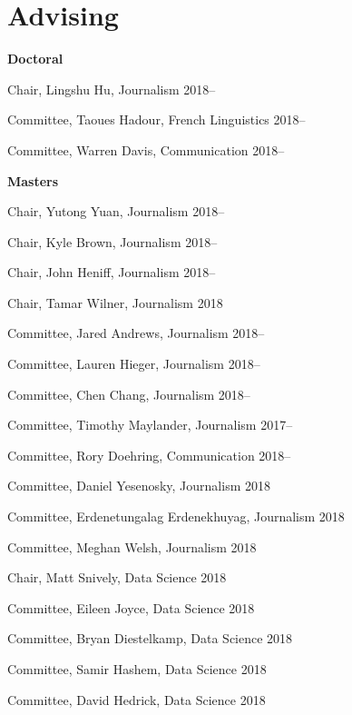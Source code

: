 
\section{Advising}

  \textbf{Doctoral}
    \begin{innerlist}
      \item Chair, Lingshu Hu, Journalism                            \hfill 2018--
      \item Committee, Taoues Hadour, French Linguistics             \hfill 2018--
      \item Committee, Warren Davis, Communication                   \hfill 2018--
    \end{innerlist}\vspace{1em}

  \textbf{Masters}
    \begin{innerlist}
      \item Chair, Yutong Yuan, Journalism                           \hfill 2018--
      \item Chair, Kyle Brown, Journalism                            \hfill 2018--
      \item Chair, John Heniff, Journalism                           \hfill 2018--
      \item Chair, Tamar Wilner, Journalism                          \hfill 2018
      \item Committee, Jared Andrews, Journalism                     \hfill 2018--
      \item Committee, Lauren Hieger, Journalism                     \hfill 2018--
      \item Committee, Chen Chang, Journalism                        \hfill 2018--
      \item Committee, Timothy Maylander, Journalism                 \hfill 2017--
      \item Committee, Rory Doehring, Communication                  \hfill 2018--
      \item Committee, Daniel Yesenosky, Journalism                  \hfill 2018
      \item Committee, Erdenetungalag Erdenekhuyag, Journalism       \hfill 2018
      \item Committee, Meghan Welsh, Journalism                      \hfill 2018
      \item Chair, Matt Snively, Data Science                        \hfill 2018
      \item Committee, Eileen Joyce, Data Science                    \hfill 2018
      \item Committee, Bryan Diestelkamp, Data Science               \hfill 2018
      \item Committee, Samir Hashem, Data Science                    \hfill 2018
      \item Committee, David Hedrick, Data Science                   \hfill 2018
    \end{innerlist}\vspace{-.1in}
